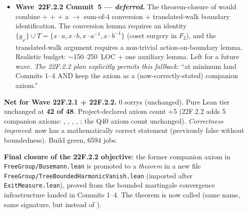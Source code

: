 \documentclass[11pt,a4paper]{article}
\newcommand{\lmod}[1]{\texttt{\small #1}}
\theoremstyle{plain}
\theoremstyle{definition}
\begin{document}
\begin{itemize}[nosep]
  \item \textbf{Wave~22F.2.2 Commit~5 --- \emph{deferred}.} The
        theorem-closure of 
        would combine
         +
         +
         +
        a  $\to$ sum-of-4 conversion +
        translated-walk boundary identification. The conversion
        lemma requires an identity
        $\{y_\varphi\} \cup T = \{x\!\cdot\!a, x\!\cdot\!b, x\!\cdot\!a^{-1}, x\!\cdot\!b^{-1}\}$
        (coset surgery in $F_2$), and the translated-walk argument
        requires a non-trivial action-on-boundary lemma. Realistic
        budget: $\sim$150--250~LOC + one auxiliary
         lemma. Left for a future
        wave. \emph{The 22F.2.2 plan explicitly permits this
        fallback:} ``at minimum land Commits 1--4 AND keep the axiom
        as a (now-correctly-stated) companion axiom.''
\end{itemize}

\textbf{Net for Wave 22F.2.1 + 22F.2.2.} 0 sorrys (unchanged).
Pure Lean tier unchanged at \textbf{42 of 48}. Project-declared axiom
count $+$5 (22F.2.2 adds 5 companion axioms:
,
,
,
,
; the Q40 axiom count
unchanged). \emph{Correctness improved}: 
now has a mathematically correct statement (previously false without
boundedness). Build green, 6594 jobs.

\textbf{Final closure of the 22F.2.2 objective}: the former companion
axiom  in
\lmod{FreeGroup/Busemann.lean} is promoted to a \emph{theorem} in a new
file \lmod{FreeGroup/TreeBoundedHarmonicVanish.lean} (imported after
\lmod{ExitMeasure.lean}), proved from the bounded martingale
convergence infrastructure landed in Commits 1--4. The theorem is now
called  (same name, same
signature, but  instead of ).
\end{document}
